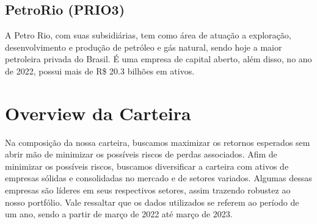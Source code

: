 \documentclass[letterpaper,12pt]{article}
\begin{document}
\subsection{PetroRio (PRIO3)}
A Petro Rio, com suas subsidiárias, tem como área de atuação a exploração, desenvolvimento e produção de petróleo e gás natural, sendo hoje a maior petroleira privada do Brasil. É uma empresa de capital aberto, além disso, no ano de 2022, possui mais de R\$ 20.3 bilhões em ativos.


\section{Overview da Carteira}


\begin{table}[h!]
\centering
{}
\label{tab:my-table}
\end{table}
\noindent Na composição da nossa carteira, buscamos maximizar os retornos esperados sem abrir mão de minimizar os possíveis riscos de perdas associados. Afim de minimizar os possíveis riscos, buscamos diversificar a carteira com ativos de empresas sólidas e consolidadas no mercado e de setores variados. Algumas dessas empresas são líderes em seus respectivos setores, assim trazendo robustez ao nosso portfólio. Vale ressaltar que os dados utilizados se referem ao período de um ano, sendo  a partir de março de 2022 até março de 2023.\\  
\end{document}

